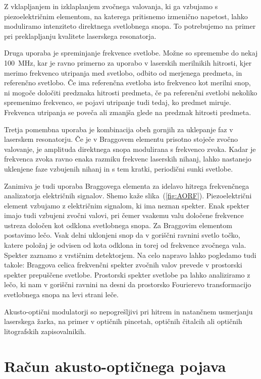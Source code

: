 Z vklapljanjem in izklaplanjem zvočnega valovanja, ki ga vzbujamo s piezoelektričnim elementom,
na katerega pritisnemo izmenično napetost, lahko moduliramo intenziteto
direktnega svetlobnega snopa. To potrebujemo na primer pri preklapljanju
kvalitete laserskega resonatorja.

Druga uporaba je spreminjanje frekvence svetlobe. Možne so spremembe
do nekaj 100~MHz, kar je ravno primerno za uporabo v laserskih merilnikih
hitrosti, kjer merimo frekvenco utripanja med svetlobo, odbito od
merjenega predmeta, in referenčno svetlobo. Če ima referenčna svetloba
isto frekvenco kot merilni snop, ni mogoče določiti predznaka hitrosti
predmeta, če pa referenčni svetlobi nekoliko spremenimo frekvenco,
se pojavi utripanje tudi tedaj, ko predmet miruje. Frekvenca utripanja
se poveča ali zmanjša glede na predznak hitrosti predmeta.

Tretja pomembna uporaba je kombinacija obeh gornjih za uklepanje faz
v laserskem resonatorju. Če je v Braggovem elementu prisotno stoječe zvočno
valovanje, je amplituda direktnega snopa modulirana s frekvenco zvoka.
Kadar je frekvenca zvoka ravno enaka razmiku frekvenc laserskih nihanj,
lahko nastanejo uklenjene faze vzbujenih nihanj in s tem kratki, periodični
sunki svetlobe.

Zanimiva je tudi uporaba Braggovega elementa za idelavo
hitrega frekvenčnega analizatorja električnih signalov. Shemo kaže slika~(\ref{fig:AORF}). 
Piezoelektrični element vzbujamo z električnim signalom,
ki ima neznan spekter. Enak spekter imajo tudi vzbujeni zvočni valovi, 
pri čemer vsakemu valu določene frekvence ustreza določen kot odklona svetlobnega
snopa. Za Braggovim elementom postavimo lečo. Vsak delni uklonjeni
snop da v goriščni ravnini svetlo točko, katere položaj je odvisen
od kota odklona in torej od frekvence zvočnega vala. Spekter zaznamo
z vrstičnim detektorjem. Na celo napravo lahko pogledamo tudi takole:
Braggova celica frekvenčni spekter zvočnih valov prevede v prostorski
spekter prepuščene svetlobe. Prostorski spekter svetlobe pa lahko
analiziramo z lečo, ki nam v goriščni ravnini na desni da prostorsko
Fourierevo transformacijo svetlobnega snopa na levi strani leče.

Akusto-optični modulatorji so nepogrešljivi pri hitrem in 
natančnem usmerjanju laserskega žarka, na primer v optičnih pincetah, optičnih čitalcih ali 
optičnih litografskih zapisovalnikih.

\section{Račun akusto-optičnega pojava}

